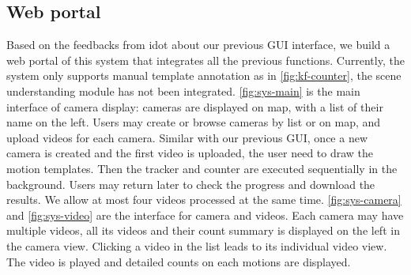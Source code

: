 

\subsection{Web portal}
Based on the feedbacks from \gls{idot} about our previous GUI interface, we build a web portal of this system that integrates all the previous functions.
Currently, the system only supports manual template annotation as in \ref{fig:kf-counter}, the scene understanding module has not been integrated.
\ref{fig:sys-main} is the main interface of camera display: cameras are displayed on map, with a list of their name on the left. 
Users may create or browse cameras by list or on map, and upload videos for each camera. 
Similar with our previous GUI, once a new camera is created and the first video is uploaded, the user need to draw the motion templates.
Then the tracker and counter are executed sequentially in the background. 
Users may return later to check the progress and download the results. We allow at most four videos processed at the same time. 
\ref{fig:sys-camera} and \ref{fig:sys-video} are the interface for camera and videos. 
Each camera may have multiple videos, all its videos and their count summary is displayed on the left in the camera view. 
Clicking a video in the list leads to its individual video view. The video is played and detailed counts on each motions are displayed.

